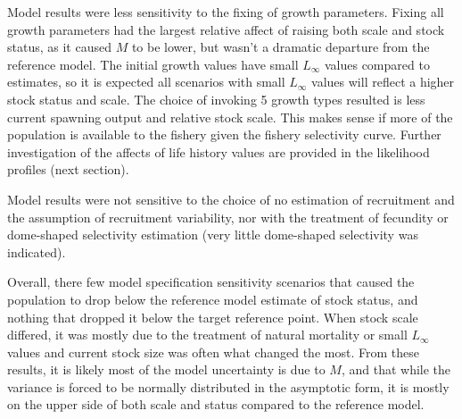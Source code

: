 \documentclass[11pt,
  english,
  a4paper,
]{article}
\begin{document}
Model results were less sensitivity to the fixing of growth parameters. Fixing all growth parameters had the largest relative affect of raising both scale and stock status, as it caused {\(M\)\leavevmode\tagmcend\tagstructend} to be lower, but wasn't a dramatic departure from the reference model. The initial growth values have small {\(L_{\infty}\)\leavevmode\tagmcend\tagstructend} values compared to estimates, so it is expected all scenarios with small {\(L_{\infty}\)\leavevmode\tagmcend\tagstructend} values will reflect a higher stock status and scale. The choice of invoking 5 growth types resulted is less current spawning output and relative stock scale. This makes sense if more of the population is available to the fishery given the fishery selectivity curve. Further investigation of the affects of life history values are provided in the likelihood profiles (next section).

\leavevmode\tagmcend\tagstructend\par


Model results were not sensitive to the choice of no estimation of recruitment and the assumption of recruitment variability, nor with the treatment of fecundity or dome-shaped selectivity estimation (very little dome-shaped selectivity was indicated).

\leavevmode\tagmcend\tagstructend\par


Overall, there few model specification sensitivity scenarios that caused the population to drop below the reference model estimate of stock status, and nothing that dropped it below the target reference point. When stock scale differed, it was mostly due to the treatment of natural mortality or small {\(L_{\infty}\)\leavevmode\tagmcend\tagstructend} values and current stock size was often what changed the most. From these results, it is likely most of the model uncertainty is due to {\(M\)\leavevmode\tagmcend\tagstructend}, and that while the variance is forced to be normally distributed in the asymptotic form, it is mostly on the upper side of both scale and status compared to the reference model.
\end{document}
